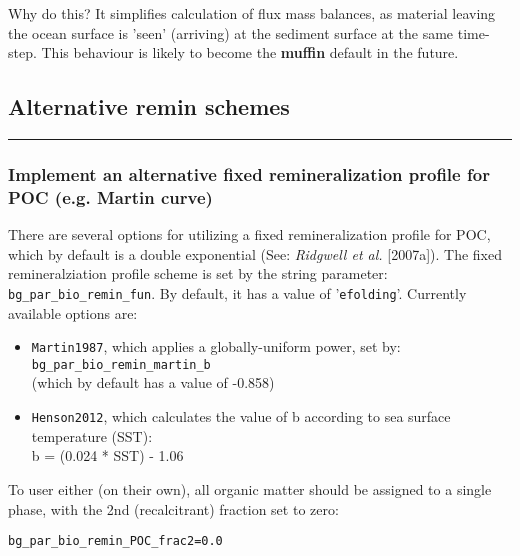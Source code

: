 \documentclass[11pt,fleqn]{book} %
\begin{document}
Why do this? It simplifies calculation of flux mass balances, as material leaving the ocean surface is 'seen' (arriving) at the sediment surface at the same time-step. This behaviour is likely to become the \textbf{muffin} default in the future.

%
\newpage
\subsection*{Alternative remin schemes}
\vspace{1mm}

\hfill \break

%
\noindent\rule{4cm}{0.5pt}
\subsubsection{Implement an alternative fixed remineralization profile for POC (e.g. Martin curve)}
\vspace{1mm}

There are several options for utilizing a fixed remineralization profile for POC, which by default is a double exponential (See: \textit{Ridgwell et al.} [2007a]).
The fixed remineralziation profile scheme is set by the string parameter: \texttt{bg\_par\_bio\_remin\_fun}. By default, it has a value of '\texttt{efolding}'. Currently available options are:

\begin{itemize}[noitemsep]

\vspace{1mm}
\item \texttt{Martin1987}, which applies a globally-uniform power, set by:
  \\ \texttt{bg\_par\_bio\_remin\_martin\_b}
  \\(which by default has a value of -0.858)

\vspace{1mm}
\item \texttt{Henson2012}, which calculates the value of b according to sea surface temperature (SST):
  \\b = (0.024 * SST) - 1.06

\end{itemize}

To user either (on their own), all organic matter should be assigned to a single phase, with the 2nd (recalcitrant) fraction set to zero:
\vspace{-2pt}\begin{verbatim}
bg_par_bio_remin_POC_frac2=0.0
\end{verbatim}\vspace{-2pt}
\end{document}
